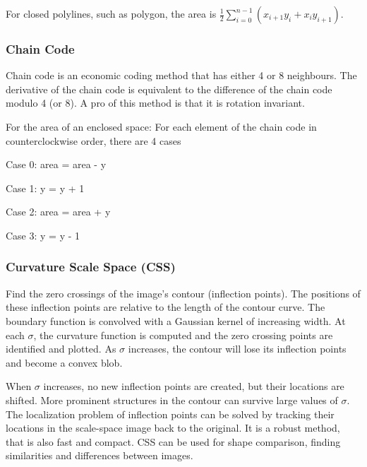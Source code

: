 \documentclass{article}
\begin{document}
\begin{multicols}{2}
  For closed polylines, such as polygon, the area is $\frac{1}{2}\sum_{i=0}^{n-1}(x_{i+1}y_i + x_iy_{i+1})$.

 \subsubsection{Chain Code}

  Chain code is an economic coding method that has either 4 or 8 neighbours.
  The derivative of the chain code is equivalent to the difference of the chain code modulo 4 (or 8).
  A pro of this method is that it is rotation invariant.

  For the area of an enclosed space:
  For each element of the chain code in counterclockwise order, there are 4 cases
  
  \vspace{2mm}
  
  Case 0: area = area - y

  \vspace{2mm}

  Case 1: y = y + 1

  \vspace{2mm}

  Case 2: area = area + y

  \vspace{2mm}

  Case 3: y = y - 1

 \subsubsection{Curvature Scale Space (CSS)}

  Find the zero crossings of the image's contour (inflection points).
  The positions of these inflection points are relative to the length of the contour curve.
  The boundary function is convolved with a Gaussian kernel of increasing width.
  At each $\sigma$, the curvature function is computed and the zero crossing points are identified and plotted.
  As $\sigma$ increases, the contour will lose its inflection points and become a convex blob.
  
  \vspace{5mm}
  
  When $\sigma$ increases, no new inflection points are created, but their locations are shifted.
  More prominent structures in the contour can survive large values of $\sigma$.
  The localization problem of inflection points can be solved by tracking their locations in the scale-space image back to the original.
  It is a robust method, that is also fast and compact.
  CSS can be used for shape comparison, finding similarities and differences between images.


\end{multicols}
\end{document}
